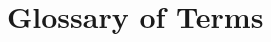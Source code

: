 \documentclass[12pt]{book}
\begin{document}
%

%

\chapter{Glossary of Terms}
\label{app:glossary}


\newpage
\begin{thebibliography}{MM99m}



\end{thebibliography}
\end{document}
